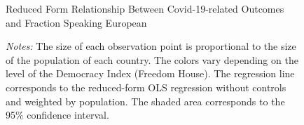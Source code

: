 \begin{figure}[!htbp]
\centering
\caption{Reduced Form Relationship Between Covid-19-related Outcomes and Fraction Speaking European}
\centering
\label{fig:reduced-eurfrac}
  \hspace{1em}%
    \hspace{1em}%
  
  \caption*{\textit{Notes:} The size of each observation point is proportional to the size of the population of each country. The colors vary depending on the level of the Democracy Index (Freedom House). The regression line corresponds to the reduced-form OLS regression without controls and weighted by population. The shaded area corresponds to the 95\% confidence interval.}
  
\end{figure}